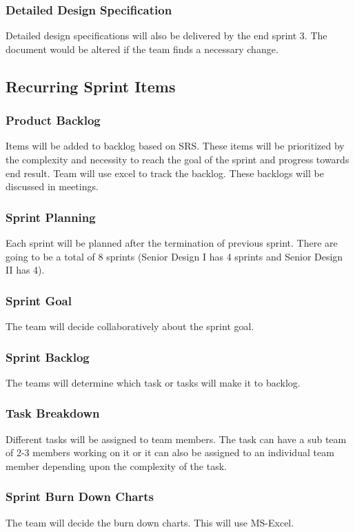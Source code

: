 \subsubsection{Detailed Design Specification}
Detailed design specifications will also be delivered by the end sprint 3. The document would be altered if the team finds a necessary change. 

\subsection{Recurring Sprint Items}


\subsubsection{Product Backlog}
Items will be added to backlog based on SRS. These items will be prioritized by the complexity and necessity to reach the goal of the sprint and progress towards end result. Team will use excel to track the backlog. These backlogs will be discussed in meetings. 

\subsubsection{Sprint Planning}
Each sprint will be planned after the termination of previous sprint. There are going to be a total of 8 sprints (Senior Design I has 4 sprints and Senior Design II has 4). 

\subsubsection{Sprint Goal}
The team will decide collaboratively about the sprint goal.  

\subsubsection{Sprint Backlog}
The teams will determine which task or tasks will make it to backlog. 

\subsubsection{Task Breakdown}
Different tasks will be assigned to team members. The task can have a sub team of 2-3 members working on it or it can also be assigned to an individual team member depending upon the complexity of the task. 

\subsubsection{Sprint Burn Down Charts}
The team will decide the burn down charts. This will use MS-Excel. 

